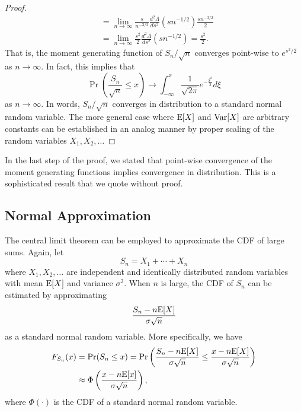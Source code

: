 \begin{proof}
\begin{equation*}
\begin{split}
&= \lim_{n \rightarrow \infty} \frac{s}{n^{-3/2}}
\frac{d^2 \Lambda}{ds^2} \left( s n^{-1/2} \right) \frac{s n^{-3/2}}{2} \\
&= \lim_{n \rightarrow \infty} \frac{s^2}{2}
\frac{d^2 \Lambda}{ds^2} \left( s n^{-1/2} \right) = \frac{s^2}{2} .
\end{split}
\end{equation*}
That is, the moment generating function of $S_n / \sqrt{n}$ converges point-wise to $e^{s^2/2}$ as $n \rightarrow \infty$.
In fact, this implies that
\begin{equation*}
\Pr \left( \frac{S_n}{\sqrt{n}} \leq x \right) \rightarrow \int_{-\infty}^x \frac{1}{\sqrt{2 \pi}} e^{-\frac{\xi^2}{2}} d\xi
\end{equation*}
as $n \rightarrow \infty$.
In words, $S_n / \sqrt{n}$ converges in distribution to a standard normal random variable.
The more general case where $\mathrm{E} [X]$ and $\mathrm{Var} [X]$ are arbitrary constants can be established in an analog manner by proper scaling of the random variables $X_1, X_2, \ldots$
\end{proof}

In the last step of the proof, we stated that point-wise convergence of the moment generating functions implies convergence in distribution.
This is a sophisticated result that we quote without proof.


\subsection{Normal Approximation}

The central limit theorem can be employed to approximate the CDF of large sums.
Again, let
\begin{equation*}
S_n = X_1 + \cdots + X_n
\end{equation*}
where $X_1, X_2, \ldots$ are independent and identically distributed random variables with mean $\mathrm{E} [X]$ and variance $\sigma^2$.
When $n$ is large, the CDF of $S_n$ can be estimated by approximating
\begin{equation*}
\frac{ S_n - n \mathrm{E} [X] } { \sigma \sqrt{n} }
\end{equation*}
as a standard normal random variable.
More specifically, we have
\begin{equation*}
\begin{split}
F_{S_n} (x) 
&= \Pr (S_n \leq x)
= \Pr \left( \frac{ S_n - n \mathrm{E} [X] }{ \sigma \sqrt{n} }
\leq \frac{x - n \mathrm{E} [X]}{\sigma \sqrt{n}} \right) \\
&\approx \Phi \left( \frac{x - n \mathrm{E} [x]}{\sigma \sqrt{n}} \right) ,
\end{split}
\end{equation*}
where $\Phi (\cdot)$ is the CDF of a standard normal random variable.


